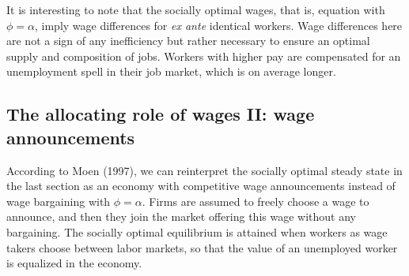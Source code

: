 It is interesting to note that the socially optimal wages, that is,
equation  with $\phi=\alpha$, imply wage differences for
{\it ex ante\/} identical workers. Wage differences here are not a sign of any
inefficiency but rather necessary to ensure an optimal
supply and composition of jobs. Workers with higher pay are
compensated for an unemployment spell in their job market, which is
on average longer.

%
\subsection{The allocating role of wages  II: wage announcements}
According to Moen (1997), we can reinterpret the socially optimal
%
steady state in the last section as an economy with competitive wage
announcements instead of wage bargaining with $\phi=\alpha$.
Firms are assumed to
freely choose a wage to announce, and then they join the market
offering this wage without any bargaining. The socially optimal equilibrium
is attained when workers as wage takers choose between labor markets,
so that the value of an unemployed worker is equalized in the economy.


